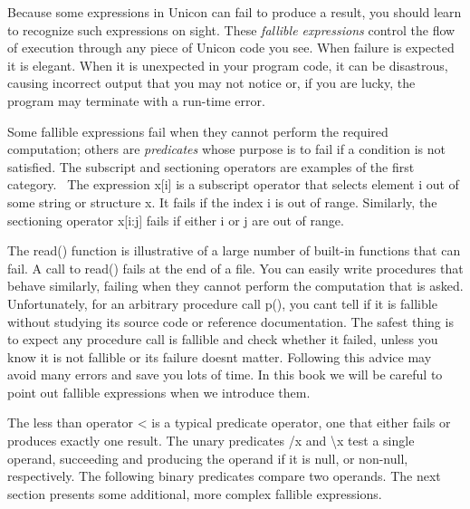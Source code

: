 Because some expressions in Unicon can fail to
produce a result, you should learn to recognize such expressions on
sight. These \textit{fallible
expression}\textit{s} control the flow of execution through any piece
of Unicon code you see. When failure is expected it is elegant. When it
is unexpected in your program code, it can be disastrous, causing
incorrect output that you may not notice or, if you are lucky, the
program may terminate with a run-time error.

Some fallible expressions fail when they cannot perform the required
computation; others are \textit{predicates} whose purpose is to fail if
a condition is not satisfied. The subscript and sectioning operators are examples of the first category. \ The
expression \textsf{x[i]} is a subscript
operator that selects element \textsf{i} out of some string or
structure \textsf{x}. It fails if the index \textsf{i} is out of range.
Similarly, the sectioning operator \textsf{x[i:j]} fails if either
\textsf{i} or \textsf{j} are out of range.

The \textsf{read()} function is illustrative of a large number of
built-in functions that can fail. A call to \textsf{read()} fails at
the end of a file. You can easily write procedures that behave
similarly, failing when they cannot perform the computation that is
asked. Unfortunately, for an arbitrary procedure call \textsf{p()}, you
can{\textquotesingle}t tell if it is fallible without studying its
source code or reference documentation. The safest
thing is to expect any procedure call is fallible and check whether it
failed, unless you know it is not fallible or its failure
doesn{\textquotesingle}t matter. Following this advice may avoid many
errors and save you lots of time. In this book we will be careful to
point out fallible expressions when we introduce them.

The less than operator \textsf{{\textless}} is a typical predicate
operator, one that either fails or produces exactly one result. The
unary predicates \textsf{/x} and \textsf{{\textbackslash}x} test a single
operand, succeeding and producing the operand if it is null, or
non-null, respectively. The following binary predicates compare two
operands. The next section presents some additional, more complex
fallible expressions.

\bigskip

